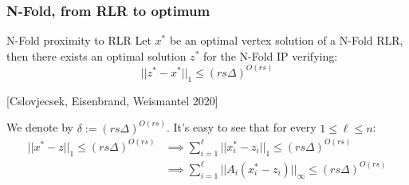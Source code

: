 \documentclass{beamer}
\begin{document}
    \begin{frame}
        \frametitle{N-Fold, from RLR to optimum}
        \begin{block}{N-Fold proximity to RLR}
            Let $x^*$ be an optimal vertex solution of a N-Fold RLR, then there exists an optimal solution $z^*$ for the N-Fold IP verifying:  
            \begin{equation*}
                ||z^* - x^*||_1 \leq (rs\Delta)^{O(rs)}
            \end{equation*}
        \end{block}
        [Cslovjecsek, Eisenbrand, Weismantel 2020]
        \vspace{0.3cm}
        
        We denote by $\delta := (rs\Delta)^{O(rs)}$. It's easy to see that for every $1 \leq \ell \leq n$:
        \begin{align*}
            ||x^* - z||_1 \leq (rs\Delta)^{O(rs)} 
            & \implies \sum_{i=1}^\ell ||x_i^* - z_i||_1 \leq (rs\Delta)^{O(rs)}\\ 
            & \implies \sum_{i=1}^\ell ||A_i(x_i^* - z_i)||_\infty \leq (rs\Delta)^{O(rs)}
        \end{align*}
        
    \end{frame}
\end{document}
